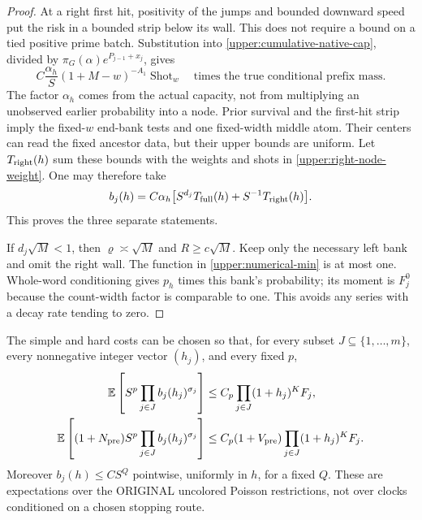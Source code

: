 \begin{proof}
At a right first hit, positivity of the jumps and bounded downward
speed put the risk in a bounded strip below its wall.  This does not
require a bound on a tied positive prime batch.  Substitution into
\eqref{upper:cumulative-native-cap}, divided by
$\pi_G(\alpha)e^{P_{j-1}+x_j}$, gives
\begin{equation}
 C\frac{\alpha_h}{S}(1+M-w)^{-A_1}
        \operatorname{Shot}_w
 \quad\text{times the true conditional prefix mass}.
 \label{upper:right-node-weight}
\end{equation}
The factor $\alpha_h$ comes from the actual capacity, not from
multiplying an unobserved earlier probability into a node.  Prior
survival and the first-hit strip imply the fixed-$w$ end-bank tests
and one fixed-width middle atom.  Their centers can read the fixed
ancestor data, but their upper bounds are uniform.  Let
$T_{\rm right}(h)$ sum these bounds with the weights and shots in
\eqref{upper:right-node-weight}.  One may therefore take
\begin{equation}
 b_j(h)=C\alpha_h\bigl[S^{d_j}T_{\rm full}(h)
                         +S^{-1}T_{\rm right}(h)\bigr].
 \label{upper:hard-cost}
\end{equation}
This proves the three separate statements.

If $d_j\sqrt M<1$, then $\varrho\asymp\sqrt M$ and $R\geq c\sqrt M$.
Keep only the necessary left bank and omit the right wall.  The function
in \eqref{upper:numerical-min} is at most one.  Whole-word conditioning
gives $p_h$ times this bank's probability; its moment is $F_j^0$ because
the count-width factor is comparable to one.  This avoids any series
with a decay rate tending to zero.
\end{proof}

\begin{lemma}
\label{upper:joint-moments}
The simple and hard costs can be chosen so that, for every subset
$J\subseteq\{1,\ldots,m\}$, every nonnegative integer vector $(h_j)$,
and every fixed $p$,
\begin{align}
 \mathbb E\left[S^p\prod_{j\in J}b_j(h_j)^{\sigma_j}\right]
 &\leq C_p\prod_{j\in J}(1+h_j)^K F_j,
 \label{upper:subset-moment}\\
 \mathbb E\left[(1+N_{\rm pre})S^p
                  \prod_{j\in J}b_j(h_j)^{\sigma_j}\right]
 &\leq C_p(1+V_{\rm pre})
                      \prod_{j\in J}(1+h_j)^K F_j.
 \label{upper:subset-count-moment}
\end{align}
Moreover $b_j(h)\leq CS^Q$ pointwise, uniformly in $h$, for a fixed $Q$.
These are expectations over the ORIGINAL uncolored Poisson restrictions,
not over clocks conditioned on a chosen stopping route.
\end{lemma}

